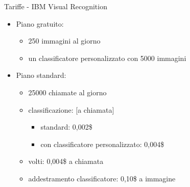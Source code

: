 %
\begin{frame}[t]{Tariffe - IBM Visual Recognition}
\begin{itemize}
	\item Piano gratuito:
	\begin{itemize}
		\item 250 immagini al giorno
		\item un classificatore personalizzato con 5000 immagini
	\end{itemize}
	\item Piano standard:
	\begin{itemize}
		\item 25000 chiamate al giorno
		\item classificazione: [a chiamata]
		\begin{itemize}
			\item standard: 0,002\$
			\item con classificatore personalizzato: 0,004\$
		\end{itemize}
		\item volti: 0,004\$ a chiamata
		\item addestramento classificatore: 0,10\$ a immagine
	\end{itemize}
\end{itemize}
\end{frame}
%
